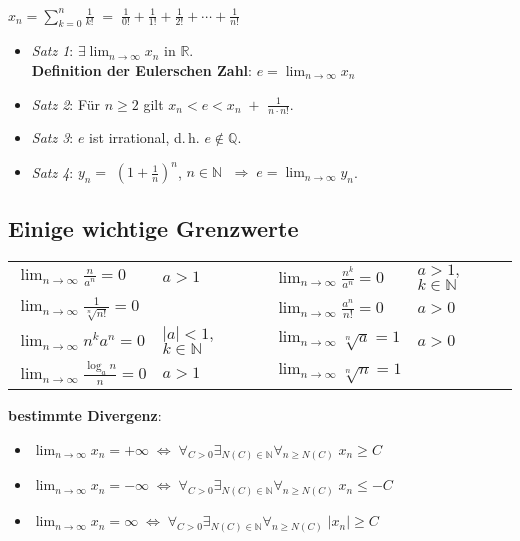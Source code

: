 {\large $x_n = \sum_{k=0}^{n} \frac{1}{k!} \;=\; \frac{1}{0!} + \frac{1}{1!} +
\frac{1}{2!} + \cdots + \frac{1}{n!}$}

\begin{itemize}
    \item \emph{Satz 1}: $\exists \lim_{n \to \infty} x_n$
    in $\mathbb{R}$. \\
    \textbf{Definition der Eulerschen Zahl}: $e = \lim_{n \to \infty} x_n$

    \item \emph{Satz 2}: Für $n \ge 2$ gilt
    $x_n < e < x_n \;+ $ {\large $\frac{1}{n \cdot n!}$}.

    \item \emph{Satz 3}: $e$ ist irrational, d.\,h. $e \notin \mathbb{Q}$.

    \item \emph{Satz 4}: $y_n =$ {\large $(1 + \frac{1}{n})^n$},
    $n \in \mathbb{N}$  $\;\Rightarrow\; e = \lim_{n \to \infty} y_n$.
\end{itemize}

\subsection{%
    Einige wichtige Grenzwerte%
}

{\large
\begin{tabular}{p{3.8cm}p{3.8cm}p{3.8cm}p{3.8cm}}
    $\lim_{n \to \infty} \frac{n}{a^n} = 0$ & $a > 1$ &
    $\lim_{n \to \infty} \frac{n^k}{a^n} = 0$ & $a > 1,$ $k \in \mathbb{N}$ \\
    $\lim_{n \to \infty} \frac{1}{\sqrt[n]{n!}} = 0$ & &
    $\lim_{n \to \infty} \frac{a^n}{n!} = 0$ & $a > 0$ \\
    $\lim_{n \to \infty} n^k a^n = 0$ & $|a| < 1,$ $k \in \mathbb{N}$ &
    $\lim_{n \to \infty} \sqrt[n]{a} = 1$ & $a > 0$ \\
    $\lim_{n \to \infty} \frac{\log_a{n}}{n} = 0$ & $a > 1$ &
    $\lim_{n \to \infty} \sqrt[n]{n} = 1$
\end{tabular}
}

\vspace{3mm}
\linie

\textbf{bestimmte Divergenz}:

\begin{itemize}
    \item $\lim_{n \to \infty} x_n = +\infty \;\Leftrightarrow\;
    \forall_{C > 0} \exists_{N(C) \in \mathbb{N}} \forall_{n \ge N(C)}\;
    x_n \ge C$

    \item $\lim_{n \to \infty} x_n = -\infty \;\Leftrightarrow\;
    \forall_{C > 0} \exists_{N(C) \in \mathbb{N}} \forall_{n \ge N(C)}\;
    x_n \le -C$

    \item $\lim_{n \to \infty} x_n = \infty \;\Leftrightarrow\;
    \forall_{C > 0} \exists_{N(C) \in \mathbb{N}} \forall_{n \ge N(C)}\;
    |x_n| \ge C$
\end{itemize}

